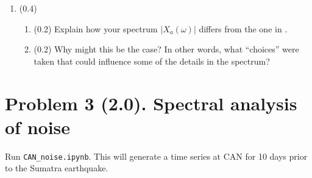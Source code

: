 \documentclass[11pt,titlepage,fleqn]{article}
\newcommand{\tfilenoise}{{\tt CAN\_noise.ipynb}}
\begin{document}
\begin{enumerate}

\item (0.4) 
%
\begin{enumerate}
\item (0.2) Explain how your spectrum $|X_a(\omega)|$ differs from the one in \citet{Park2005}.
\item (0.2) Why might this be the case? In other words, what ``choices'' were taken that could influence some of the details in the spectrum?
\end{enumerate}

\end{enumerate}


\pagebreak
\section*{Problem 3 (2.0). Spectral analysis of noise}

Run \tfilenoise. This will generate a time series at CAN for 10 days prior to the Sumatra earthquake.
\end{document}
